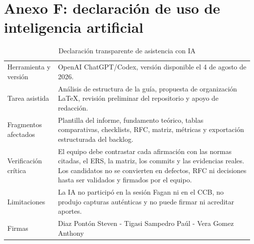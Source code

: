 \documentclass[11pt,a4paper]{article}
\begin{document}
	\section{Anexo F: declaración de uso de inteligencia artificial}
	\begin{table}[H]
		\centering
		\caption{Declaración transparente de asistencia con IA}
		\begin{tabularx}{\textwidth}{p{3.5cm}X}
			\toprule
			Herramienta y versión & OpenAI ChatGPT/Codex, versión disponible el 4 de agosto de 2026.\\
			Tarea asistida & Análisis de estructura de la guía, propuesta de organización \LaTeX, revisión preliminar del repositorio y apoyo de redacción.\\
			Fragmentos afectados & Plantilla del informe, fundamento teórico, tablas comparativas, checklists, RFC, matriz, métricas y exportación estructurada del backlog.\\
			Verificación crítica & El equipo debe contrastar cada afirmación con las normas citadas, el ERS, la matriz, los commits y las evidencias reales. Los candidatos no se convierten en defectos, RFC ni decisiones hasta ser validados y firmados por el equipo.\\
			Limitaciones & La IA no participó en la sesión Fagan ni en el CCB, no produjo capturas auténticas y no puede firmar ni acreditar aportes.\\
			Firmas &  Diaz Pontón Steven - Tigasi Sampedro Paúl - Vera Gomez Anthony\\
			\bottomrule
		\end{tabularx}
	\end{table}
	
\end{document}
